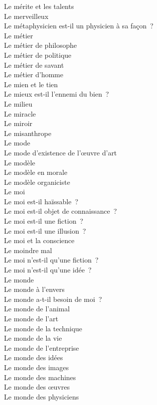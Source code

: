 \documentclass[a4paper,12pt]{article}
\begin{document}
Le mérite et les talents \\
Le merveilleux \\
Le métaphysicien est-il un physicien à sa façon ? \\
Le métier \\
Le métier de philosophe \\
Le métier de politique \\
Le métier de savant \\
Le métier d'homme \\
Le mien et le tien \\
Le mieux est-il l'ennemi du bien ? \\
Le milieu \\
Le miracle \\
Le miroir \\
Le misanthrope \\
Le mode \\
Le mode d'existence de l'œuvre d'art \\
Le modèle \\
Le modèle en morale \\
Le modèle organiciste \\
Le moi \\
Le moi est-il haïssable ? \\
Le moi est-il objet de connaissance ? \\
Le moi est-il une fiction ? \\
Le moi est-il une illusion ? \\
Le moi et la conscience \\
Le moindre mal \\
Le moi n'est-il qu'une fiction ? \\
Le moi n'est-il qu'une idée ? \\
Le monde \\
Le monde à l'envers \\
Le monde a-t-il besoin de moi ? \\
Le monde de l'animal \\
Le monde de l'art \\
Le monde de la technique \\
Le monde de la vie \\
Le monde de l'entreprise \\
Le monde des idées \\
Le monde des images \\
Le monde des machines \\
Le monde des œuvres \\
Le monde des physiciens \\
\end{document}
